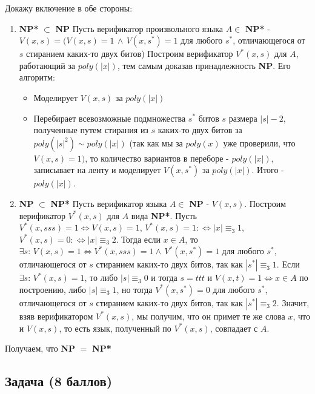 \begin{solution}
    Докажу включение в обе стороны:
    \begin{enumerate}
        \item \textbf{NP*} $\subset$ \textbf{NP}
              Пусть верификатор произвольного языка $A \in $ \textbf{NP*} - $V(x, s) = (V(x, s) = 1 \, \wedge \, V(x, s^*) = 1$ для любого $s^*$, отличающегося от $s$ стиранием каких-то двух битов) Построим верификатор $V^*(x, s)$ для  $A$, работающий за $poly(|x|)$, тем самым доказав принадлежность \textbf{NP}. Его алгоритм:
              \begin{itemize}
                  \item Моделирует $V(x, s)$ за $poly(|x|)$
                  \item Перебирает всевозможные подмножества $s^*$ битов $s$ размера $|s| - 2$, полученные путем стирания из $s$ каких-то двух битов за $poly(|s|^2) \sim poly(|x|)$ (так как мы за $poly(x)$ уже проверили, что $V(x, s) = 1)$, то количество вариантов в переборе - $poly(|x|)$, записывает на ленту и моделирует $V(x, s^*)$ за $poly(|x|)$. Итого - $poly(|x|)$.
              \end{itemize}
        \item \textbf{NP} $\subset$ \textbf{NP*}
              Пусть верификатор языка $A \in$ \textbf{NP} - $V(x, s)$. Построим верификатор $V^*(x, s)$ для $A$ вида \textbf{NP*}. Пусть $V^*(x, sss) = 1 \Leftrightarrow V(x, s) = 1$, $V^*(x, s) = 1: \Leftrightarrow |x| \equiv_3 1$, $V^*(x, s) = 0: \Leftrightarrow |x| \equiv_3 2$. Тогда если $x \in A$, то $\exists s: \, V(x, s) = 1 \Leftrightarrow V^*(x, sss) = 1 \wedge \, V^*(x, s^*) = 1$ для любого $s^*$, отличающегося от $s$ стиранием каких-то двух битов, так как $|s^*| \equiv_3 1$. Если $\exists s: \, V^*(x, s) = 1$, то либо $|s| \equiv_3 0$ и тогда $s=ttt$ и $V(x, t) = 1 \Leftrightarrow x \in A$ по построению, либо $|s| \equiv_3 1$, но тогда $V^*(x, s^*) = 0$ для любого $s^*$, отличающегося от $s$ стиранием каких-то двух битов, так как $|s^*| \equiv_3 2$. Значит, взяв верификатором $V^*(x, s)$, мы получим, что он примет те же слова $x$, что и $V(x, s)$, то есть язык, полученный по $V^*(x, s)$, совпадает с $A$.
    \end{enumerate}
    Получаем, что \textbf{NP} $=$ \textbf{NP*}
\end{solution}


\subsection{Задача \textbf{(8 баллов)}}

